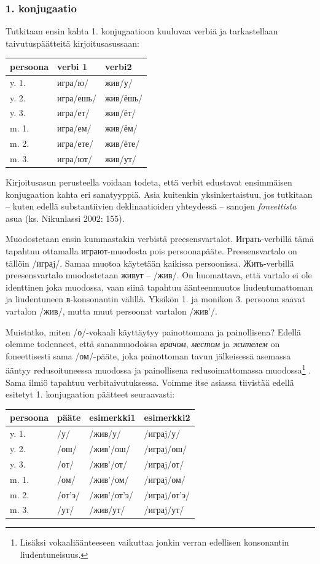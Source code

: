 \documentclass[]{scrartcl}
\begin{document}
\subsubsection{1. konjugaatio}\label{konjugaatio}

Tutkitaan ensin kahta 1. konjugaatioon kuuluvaa verbiä ja tarkastellaan
taivutuspäätteitä kirjoitusasussaan:

\begin{longtable}[c]{@{}lll@{}}
\toprule
persoona & verbi 1 & verbi2\tabularnewline
\midrule
\endhead
y. 1. & игра/ю/ & жив/у/\tabularnewline
y. 2. & игра/ешь/ & жив/ёшь/\tabularnewline
y. 3. & игра/ет/ & жив/ёт/\tabularnewline
m. 1. & игра/ем/ & жив/ём/\tabularnewline
m. 2. & игра/ете/ & жив/ёте/\tabularnewline
m. 3. & игра/ют/ & жив/ут/\tabularnewline
\bottomrule
\end{longtable}

Kirjoitusasun perusteella voidaan todeta, että verbit edustavat
ensimmäisen konjugaation kahta eri sanatyyppiä. Asia kuitenkin
yksinkertaistuu, jos tutkitaan -- kuten edellä substantiivien
deklinaatioiden yhteydessä -- sanojen \emph{foneettista} asua (ks.
Nikunlassi 2002: 155).

Muodostetaan ensin kummastakin verbistä preesensvartalot.
Играть-verbillä tämä tapahtuu ottamalla играют-muodosta pois
persoonapääte. Preesensvartalo on tällöin /играj/. Samaa muotoa
käytetään kaikissa persoonissa. Жить-verbillä preesensvartalo
muodostetaan живут -- /жив/. On huomattava, että vartalo ei ole
identtinen joka muodossa, vaan siinä tapahtuu äänteenmuutos
liudentumattoman ja liudentuneen в-konsonantin välillä. Yksikön 1. ja
monikon 3. persoona saavat vartalon /жив/, mutta muut persoonat vartalon
/жив'/.

Muistatko, miten /о/-vokaali käyttäytyy painottomana ja painollisena?
Edellä olemme todenneet, että sananmuodoissa \emph{врачом},
\emph{местом} ja \emph{жителем} on foneettisesti sama /ом/-pääte, joka
painottoman tavun jälkeisessä asemassa ääntyy redusoituneessa muodossa
ja painollisena redusoimattomassa muodossa\footnote{Lisäksi
  vokaaliäänteeseen vaikuttaa jonkin verran edellisen konsonantin
  liudentuneisuus.} . Sama ilmiö tapahtuu verbitaivutuksessa. Voimme
itse asiassa tiivistää edellä esitetyt 1. konjugaation päätteet
seuraavasti:

\begin{longtable}[c]{@{}llll@{}}
\toprule
persoona & pääte & esimerkki1 & esimerkki2\tabularnewline
\midrule
\endhead
y. 1. & /у/ & /жив/у/ & /играj/у/\tabularnewline
y. 2. & /ош/ & /жив'/ош/ & /играj/ош/\tabularnewline
y. 3. & /от/ & /жив'/от/ & /играj/от/\tabularnewline
m. 1. & /ом/ & /жив'/ом/ & /играj/ом/\tabularnewline
m. 2. & /от'э/ & /жив'/от'э/ & /играj/от'э/\tabularnewline
m. 3. & /ут/ & /жив/ут/ & /играj/ут/\tabularnewline
\bottomrule
\end{longtable}
\end{document}
